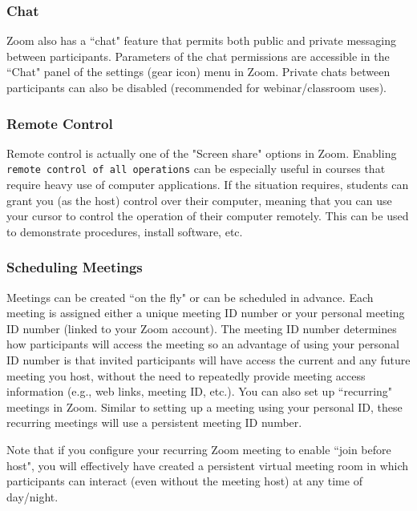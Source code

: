 \subsubsection{Chat}
    Zoom also has a ``chat" feature that permits both public and private messaging between participants.  Parameters of the chat permissions are accessible in the ``Chat" panel of the settings (gear icon) menu in Zoom.  Private chats between participants can also be disabled (recommended for webinar/classroom uses).
\subsubsection{Remote Control}
    Remote control is actually one of the "Screen share" options in Zoom. Enabling \texttt{remote control of all operations} can be especially useful in courses that require heavy use of computer applications.  If the situation requires, students can grant you (as the host) control over their computer, meaning that you can use your cursor to control the operation of their computer remotely.  This can be used to demonstrate procedures, install software, etc.
\subsubsection{Scheduling Meetings}
    Meetings can be created ``on the fly" or can be scheduled in advance.  Each meeting is assigned either a unique meeting ID number or your personal meeting ID number (linked to your Zoom account). The meeting ID number determines how participants will access the meeting so an advantage of using your personal ID number is that invited participants will have access the current and any future meeting you host, without the need to repeatedly provide meeting access information (e.g., web links, meeting ID, etc.). You can also set up ``recurring" meetings in Zoom.  Similar to setting up a meeting using your personal ID, these recurring meetings will use a persistent meeting ID number. 
    
    Note that if you configure your recurring Zoom meeting to enable ``join before host", you will effectively have created a persistent virtual meeting room in which participants can interact (even without the meeting host) at any time of day/night.
    

